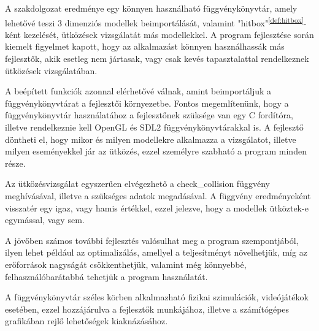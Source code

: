 
A szakdolgozat eredménye egy könnyen használható függvénykönyvtár, amely lehetővé teszi 3 dimenziós modellek beimportálását, valamint "hitbox"\textsuperscript{\ref{def:hitbox}}-ként kezelését, ütközések vizsgálatát más modellekkel. A program fejlesztése során kiemelt figyelmet kapott, hogy az alkalmazást könnyen használhassák más fejlesztők, akik esetleg nem jártasak, vagy csak kevés tapasztalattal rendelkeznek ütközések vizsgálatában.

A beépített funkciók azonnal elérhetővé válnak, amint beimportáljuk a függvénykönyvtárat a fejlesztői környezetbe. Fontos megemlítenünk, hogy a függvénykönyvtár használatához a fejlesztőnek szüksége van egy C fordítóra, illetve rendelkeznie kell OpenGL \cite{OpenGL} és SDL2 \cite{SDL2} függvénykönyvtárakkal is. A fejlesztő döntheti el, hogy mikor és milyen modellekre alkalmazza a vizsgálatot, illetve milyen eseményekkel jár az ütközés, ezzel személyre szabható a program minden része.

Az ütközésvizsgálat egyszerűen elvégezhető a check\_collision függvény meghívásával, illetve a szükséges adatok megadásával. A függvény eredményeként visszatér egy igaz, vagy hamis értékkel, ezzel jelezve, hogy a modellek ütköztek-e egymással, vagy sem.

A jövőben számos további fejlesztés valósulhat meg a program szempontjából, ilyen lehet például az optimalizálás, amellyel a teljesítményt növelhetjük, míg az erőforrások nagyságát csökkenthetjük, valamint még könnyebbé, felhasználóbarátabbá tehetjük a program használatát.

A függvénykönyvtár széles körben alkalmazható fizikai szimulációk, videójátékok esetében, ezzel hozzájárulva a fejlesztők munkájához, illetve a számítógépes grafikában rejlő lehetőségek kiaknázásához.